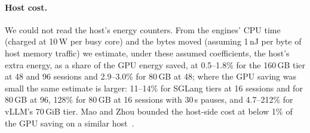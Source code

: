 \paragraph{Host cost.} We could not read the host's energy counters. From the engines' CPU time (charged at 10\,W per
busy core) and the bytes moved (assuming 1\,nJ per byte of host memory traffic) we estimate, under these assumed coefficients, the host's extra energy, as a
share of the GPU energy saved, at 0.5--1.8\% for the 160\,GB tier at 48 and 96 sessions and 2.9--3.0\% for 80\,GB at 48;
where the GPU saving was small the same estimate is larger: 11--14\% for SGLang tiers at 16 sessions and for 80\,GB at
96, 128\% for 80\,GB at 16 sessions with 30\,s pauses, and 4.7--212\% for vLLM's 70\,GiB tier. Mao and Zhou bounded the host-side cost at below 1\% of the GPU saving on a
similar host~\cite{mao2026offloading}.
